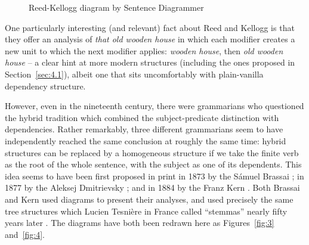 \documentclass[output=paper
 	        ,biblatex
                ,babelshorthands
                ,newtxmath
                ,draftmode
                ,colorlinks, citecolor=brown
]{langscibook}
\begin{document}
 \begin{figure}
 	\centering
{}
	\caption{Reed-Kellogg diagram by Sentence Diagrammer}
	\label{fig:2}
 \end{figure}
 
One particularly interesting (and relevant) fact about Reed and Kellogg is that they offer an analysis of \emph{that old wooden house} in which each modifier creates a new unit to which the next modifier applies: \emph{wooden house}, then \emph{old wooden house} \citep[18]{Percival1976} – a clear hint at more modern structures (including the ones proposed in Section~\ref{sec:4.1}), albeit one that sits uncomfortably with plain-vanilla dependency structure.
 
However, even in the nineteenth century, there were grammarians who questioned the hybrid tradition which combined the subject-predicate distinction with dependencies. Rather remarkably, three different grammarians seem to have independently reached the same conclusion at roughly the same time: hybrid structures can be replaced by a homogeneous structure if we take the finite verb as the root of the whole sentence, with the subject as one of its dependents. This idea seems to have been first proposed in print in 1873 by the  Sámuel Brassai \citep{Imrenyi2013a,ImrenyiVladarTBA}; in 1877 by the  Aleksej Dmitrievsky \citep{Seriot2004}; and in 1884 by the  Franz Kern \citep{Kern1884a-u}. Both Brassai and Kern used diagrams to present their analyses, and used precisely the same tree structures which Lucien Tesnière in France called ``stemmas'' nearly fifty years later \citep{Tesniere59a-u,Tesniere2015a-u}. The diagrams have both been redrawn here as Figures~\ref{fig:3} and~\ref{fig:4}.
\end{document}
